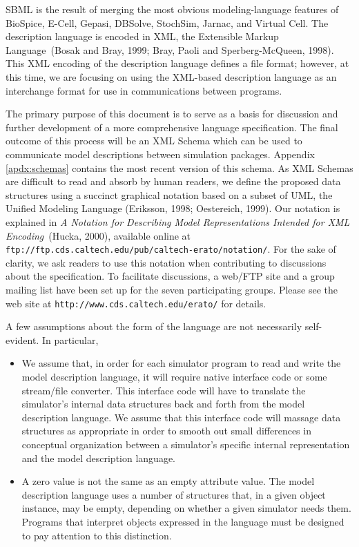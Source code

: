 \documentclass[10pt]{article}
\newcommand{\url}[1]{\textup{\texttt{#1}}}
\newcommand{\notationdocloc}{\url{ftp://ftp.cds.caltech.edu/pub/caltech-erato/notation/}}
\newcommand{\eratowebloc}{\url{http://www.cds.caltech.edu/erato/}}
\begin{document}
SBML is the result of merging the most obvious modeling-language
features of BioSpice, E-Cell, Gepasi, DBSolve, StochSim, Jarnac,
and Virtual Cell.  The description language is encoded in XML, the
Extensible Markup Language~(Bosak and Bray, 1999; Bray, Paoli and
Sperberg-McQueen, 1998).  This XML encoding of the description
language defines a file format; however, at this time, we are
focusing on using the XML-based description language as an
interchange format for use in communications between programs.

The primary purpose of this document is to serve as a basis for
discussion and further development of a more comprehensive
language specification. The final outcome of this process will be
an XML Schema which can be used to communicate model descriptions
between simulation packages. Appendix \ref{apdx:schemas} contains
the most recent version of this schema.  As XML Schemas are
difficult to read and absorb by human readers, we define the
proposed data structures using a succinct graphical notation
based on a subset of UML, the Unified Modeling Language
(Eriksson, 1998; Oestereich, 1999).  Our notation is explained in
\emph{A Notation for
  Describing Model Representations Intended for XML Encoding}~(Hucka,
2000), available online at \notationdocloc{}.  For the sake of clarity, we
ask readers to use this notation when contributing to discussions about the
specification.  To facilitate discussions, a web/FTP site and a group
mailing list have been set up for the seven participating groups.  Please
see the web site at \eratowebloc{} for details.

A few assumptions about the form of the language are not
necessarily self-evident.  In particular,
\begin{itemize}

\item We assume that, in order for each simulator program to read and write
  the model description language, it will require native interface code or
  some stream/file converter.
  This interface code will have to translate the simulator's internal data
  structures back and forth from the model description language.  We assume
  that this interface code will massage data structures as appropriate in
  order to smooth out small differences in conceptual organization between
  a simulator's specific internal representation and the model description
  language.

\item A zero value is not the same as an empty attribute value.  The model
  description language uses a number of structures that, in a given object
  instance, may be empty, depending on whether a given simulator needs
  them.  Programs that interpret objects expressed in the language must be
  designed to pay attention to this distinction.

\end{itemize}
\end{document}

